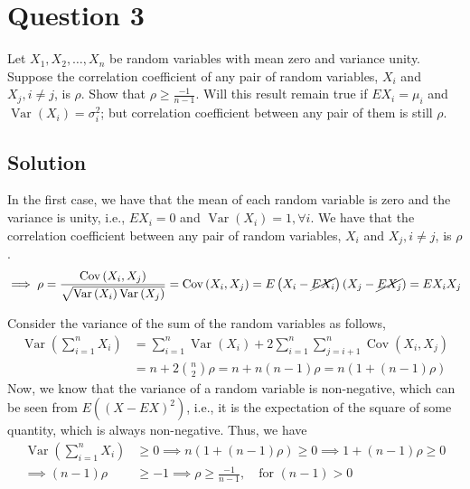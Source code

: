 \section*{Question 3}

Let \( X_{1}, X_{2}, \dots, X_{n} \) be random variables with mean zero and variance unity.
Suppose the correlation coefficient of any pair of random variables, \( X_{i} \) and \( X_{j}, i \neq j \), is \( \rho \).
Show that \( \rho \geq \frac{-1}{n-1} \).
Will this result remain true if \( E X_{i}=\mu_{i} \) and \( \operatorname{Var}\left(X_{i}\right)=\sigma_{i}^{2} \); but correlation coefficient between any pair of them is still \( \rho \).

\subsection*{Solution}

In the first case, we have that the mean of each random variable is zero and the variance is unity, i.e., \( E X_{i}=0 \) and \( \operatorname{Var}\left(X_{i}\right)=1, \forall i \).
We have that the correlation coefficient between any pair of random variables, \( X_{i} \) and \( X_{j}, i \neq j \), is \( \rho \).
\begin{equation*}
    \implies
    \rho
    =
    \frac{\operatorname{Cov}\left(X_{i}, X_{j}\right)}{\sqrt{\operatorname{Var}\left(X_{i}\right) \operatorname{Var}\left(X_{j}\right)}}
    =
    \operatorname{Cov}\left(X_{i}, X_{j}\right)
    =
    E\left(X_{i} - \cancel{E X_{i}}\right)\left(X_{j} - \cancel{E X_{j}}\right)
    =
    E X_{i} X_{j}
\end{equation*}

Consider the variance of the sum of the random variables as follows,
\begin{align*}
    \operatorname{Var}\left(\sum_{i=1}^{n} X_{i}\right)
     & =
    \sum_{i=1}^{n} \operatorname{Var}\left(X_{i}\right)
    + 2 \sum_{i=1}^{n} \sum_{j=i+1}^{n} \operatorname{Cov}\left(X_{i}, X_{j}\right)
    \\ & =
    n + 2 \binom{n}{2} \rho
    =
    n + n(n-1) \rho
    =
    n(1 + (n-1) \rho)
\end{align*}
Now, we know that the variance of a random variable is non-negative, which can be seen from \( E({(X - E X)}^{2}) \), i.e., it is the expectation of the square of some quantity, which is always non-negative.
Thus, we have
\begin{align*}
    \operatorname{Var}\left(\sum_{i=1}^{n} X_{i}\right)
     & \geq
    0
    \implies
    n(1 + (n-1) \rho)
    \geq
    0
    \implies
    1 + (n-1) \rho
    \geq
    0
    \\
    \implies
    (n-1) \rho
     & \geq
    -1
    \implies
    \boxed{
        \rho
        \geq
        \frac{-1}{n-1}
    }
    , \quad \text{for } (n - 1) > 0
\end{align*}
